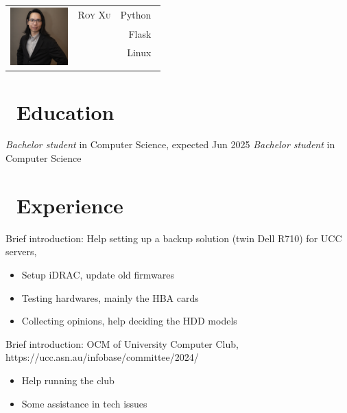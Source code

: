 \documentclass{resume}
\begin{document}

{
\Large{
  \begin{tabu}{ c l r }
    & \scshape{Roy Xu} & {Python~} \\
    &  & {Flask~} \\
    &  & {Linux~} \\
    & \\
    & 
  \end{tabu}
}
}

\section{\faGraduationCap\ Education}
\textit{Bachelor student} in Computer Science, expected Jun 2025
\textit{Bachelor student} in Computer Science

\section{\faUsers\ Experience}
Brief introduction: Help setting up a backup solution (twin Dell R710) for UCC servers, 
\begin{itemize}
  \item Setup iDRAC, update old firmwares
  \item Testing hardwares, mainly the HBA cards
  \item Collecting opinions, help deciding the HDD models
\end{itemize}


Brief introduction: OCM of University Computer Club, https://ucc.asn.au/infobase/committee/2024/
\begin{itemize}
  \item Help running the club
  \item Some assistance in tech issues
\end{itemize}
\end{document}

